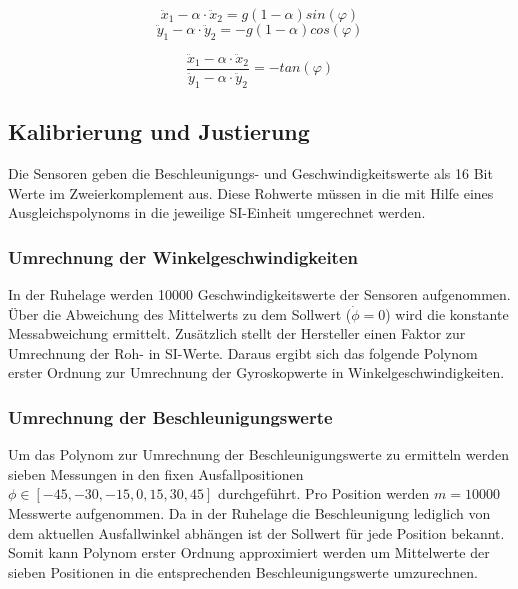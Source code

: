 \begin{equation}
\ddot{x}_1 - \alpha \cdot \ddot{x}_2 = 
g(1 - \alpha)sin(\varphi)
\end{equation}
\begin{equation}
\ddot{y}_1 - \alpha \cdot \ddot{y}_2 = 
-g(1- \alpha)cos(\varphi)
\end{equation}

\begin{equation}
\frac{\ddot{x}_1 - \alpha \cdot \ddot{x}_2}{\ddot{y}_1 - \alpha \cdot \ddot{y}_2} = -tan(\varphi)
\end{equation}

\subsection{Kalibrierung und Justierung}
Die Sensoren geben die Beschleunigungs- und Geschwindigkeitswerte als 16 Bit Werte im Zweierkomplement aus. Diese Rohwerte müssen in die mit Hilfe eines Ausgleichspolynoms in die jeweilige SI-Einheit umgerechnet werden. 

\subsubsection{Umrechnung der Winkelgeschwindigkeiten}
In der Ruhelage werden 10000 Geschwindigkeitswerte der Sensoren aufgenommen. Über die Abweichung des Mittelwerts zu dem Sollwert ($\dot{\phi}=0$) wird die konstante Messabweichung ermittelt. Zusätzlich stellt der Hersteller einen Faktor zur Umrechnung der Roh- in SI-Werte. Daraus ergibt sich das folgende Polynom erster Ordnung zur Umrechnung der Gyroskopwerte in Winkelgeschwindigkeiten.


\subsubsection{Umrechnung der Beschleunigungswerte}
Um das Polynom zur Umrechnung der Beschleunigungswerte zu ermitteln werden sieben Messungen in den fixen Ausfallpositionen $\phi \in [-45, -30, -15, 0, 15, 30, 45]$ durchgeführt. Pro Position werden $m = 10000$ Messwerte aufgenommen. Da in der Ruhelage die Beschleunigung lediglich von dem aktuellen Ausfallwinkel abhängen ist der Sollwert für jede Position bekannt. Somit kann Polynom erster Ordnung approximiert werden um Mittelwerte der sieben Positionen in die entsprechenden Beschleunigungswerte umzurechnen.
